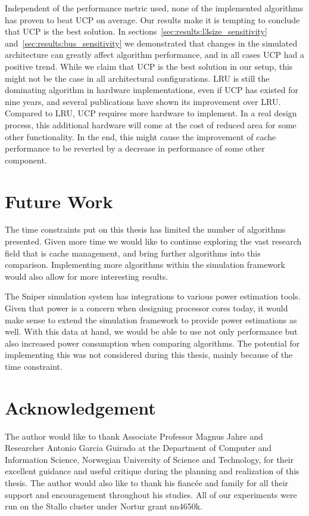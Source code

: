 Independent of the performance metric used, none of the implemented algorithms has proven to beat UCP on average.
Our results make it is tempting to conclude that UCP is the best solution.
In sections~\ref{sec:results:l3size_sensitivity} and~\ref{sec:results:bus_sensitivity} we demonstrated that changes in the simulated architecture can greatly affect algorithm performance, and in all cases UCP had a positive trend.
While we claim that UCP is the best solution in our setup, this might not be the case in all architectural configurations.
LRU is still the dominating algorithm in hardware implementations, even if UCP has existed for nine years, and several publications have shown its improvement over LRU.
Compared to LRU, UCP requires more hardware to implement. 
In a real design process, this additional hardware will come at the cost of reduced area for some other functionality.
In the end, this might cause the improvement of cache performance to be reverted by a decrease in performance of some other component.

\section{Future Work}

The time constraints put on this thesis has limited the number of algorithms presented.
Given more time we would like to continue exploring the vast research field that is cache management, and bring further algorithms into this comparison.
Implementing more algorithms within the simulation framework would also allow for more interesting results.

The Sniper simulation system has integrations to various power estimation tools.
Given that power is a concern when designing processor cores today, it would make sense to extend the simulation framework to provide power estimations as well.
With this data at hand, we would be able to use not only performance but also increased power consumption when comparing algorithms.
The potential for implementing this was not considered during this thesis, mainly because of the time constraint.

\section{Acknowledgement}
The author would like to thank Associate Professor Magnus
Jahre and  Researcher Antonio Garcia Guirado at the Department of Computer and Information Science, Norwegian University of Science and Technology, for their excellent guidance and useful critique during the planning and realization of this thesis.
The author would also like to thank his fiancée and family for all their support and encouragement throughout his studies.
All of our experiments were run on the Stallo cluster under Nortur grant nn4650k.